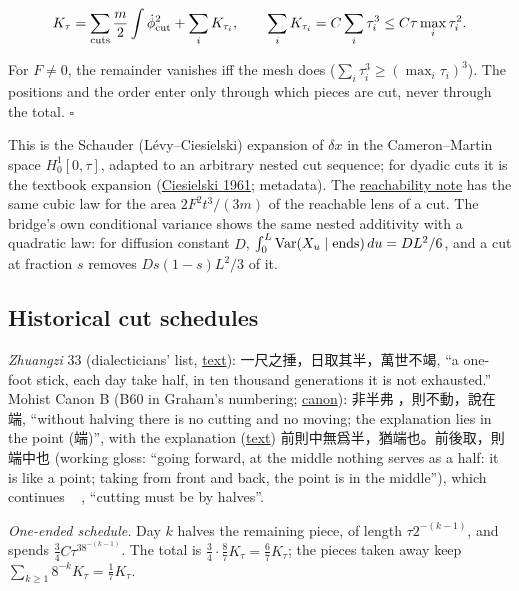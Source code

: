 \documentclass[11pt,a4paper]{article}
\begin{document}
\[K_\tau=\sum_{\rm cuts}\frac m2\int\dot\phi_{\rm cut}^2+\sum_iK_{\tau_i},\qquad
\sum_iK_{\tau_i}=C\sum_i\tau_i^3\le C\tau\max_i\tau_i^2 .\]

For \(F\ne0\), the remainder vanishes iff the mesh does
(\(\sum_i\tau_i^3\ge(\max_i\tau_i)^3\)). The positions and the order
enter only through which pieces are cut, never through the total.
\(\square\)

This is the Schauder (Lévy--Ciesielski) expansion of \(\delta x\) in the
Cameron--Martin space \(H^1_0[0,\tau]\), adapted to an arbitrary nested
cut sequence; for dyadic cuts it is the textbook expansion
(\href{https://doi.org/10.1090/S0002-9947-1961-0132591-2}{Ciesielski
1961}; metadata). The
\href{causal-force-information.md\#endpoint-lens-causal-delay-and-exact-cut-composition}{reachability
note} has the same cubic law for the area \(2F^2t^3/(3m)\) of the
reachable lens of a cut. The bridge's own conditional variance shows the
same nested additivity with a quadratic law: for diffusion constant
\(D\), \(\int_0^L{\rm Var}(X_u\mid{\rm ends})\,du=DL^2/6\), and a cut at
fraction \(s\) removes \(Ds(1-s)L^2/3\) of it.

\hypertarget{historical-cut-schedules}{%
\subsection{Historical cut schedules}\label{historical-cut-schedules}}

\emph{Zhuangzi} 33 (dialecticians' list,
\href{../docs/classics/Zhuangzi_33_Tianxia_zh_wikisource.md}{text}):
一尺之捶，日取其半，萬世不竭, ``a one-foot stick, each day take half, in
ten thousand generations it is not exhausted.'' Mohist Canon B (B60 in
Graham's numbering;
\href{../docs/classics/Mozi_Canons_B_JingXia_zh_wikisource.md}{canon}):
非半弗𣃈，則不動，說在端, ``without halving there is no cutting and no
moving; the explanation lies in the point (端)'', with the explanation
(\href{../docs/classics/Mozi_Canons_B_Explanations_JingShuoXia_zh_wikisource.md}{text})
前則中無爲半，猶端也。前後取，則端中也 (working gloss: ``going forward,
at the middle nothing serves as a half: it is like a point; taking from
front and back, the point is in the middle''), which continues 𣃈必半,
``cutting must be by halves''.

\emph{One-ended schedule.} Day \(k\) halves the remaining piece, of
length \(\tau2^{-(k-1)}\), and spends \(\frac34C\tau^38^{-(k-1)}\). The
total is \(\frac34\cdot\frac87K_\tau=\frac67K_\tau\); the pieces taken
away keep \(\sum_{k\ge1}8^{-k}K_\tau=\frac17K_\tau\).
\end{document}
